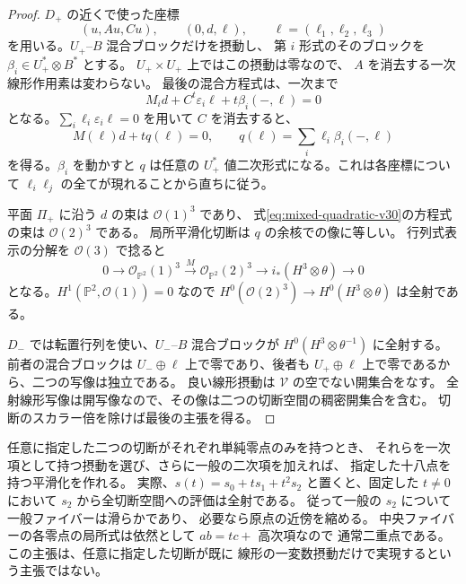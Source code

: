 \begin{proof}
$D_+$ の近くで使った座標
\[
 (u,Au,Cu),\qquad(0,d,\ell),\qquad
 \ell=(\ell_1,\ell_2,\ell_3)
\]
を用いる。$U_+$--$B$ 混合ブロックだけを摂動し、
第 $i$ 形式のそのブロックを
$\beta_i\in U_+^*\otimes B^*$ とする。
$U_+\times U_+$ 上ではこの摂動は零なので、
$A$ を消去する一次線形作用素は変わらない。
最後の混合方程式は、一次まで
\[
 M_i d+C^t\varepsilon_i\ell+t\beta_i(-,\ell)=0
\]
となる。$\sum_i\ell_i\varepsilon_i\ell=0$ を用いて $C$ を消去すると、
\begin{equation}
 M(\ell)d+tq(\ell)=0,\qquad
 q(\ell)=\sum_i\ell_i\beta_i(-,\ell)
 \label{eq:mixed-quadratic-v30}
\end{equation}
を得る。$\beta_i$ を動かすと $q$ は任意の
$U_+^*$ 値二次形式になる。これは各座標について
$\ell_i\ell_j$ の全てが現れることから直ちに従う。

平面 $\Pi_+$ に沿う $d$ の束は $\mathcal O(1)^3$ であり、
式\eqref{eq:mixed-quadratic-v30}の方程式の束は $\mathcal O(2)^3$ である。
局所平滑化切断は $q$ の余核での像に等しい。
行列式表示の分解を $\mathcal O(3)$ で捻ると
\begin{equation}
 0\longrightarrow\mathcal O_{\mathbb P^2}(1)^3
 \xrightarrow{M}\mathcal O_{\mathbb P^2}(2)^3
 \longrightarrow i_*(H^3\otimes\theta)\longrightarrow0
 \label{eq:t1-resolution-v30}
\end{equation}
となる。$H^1(\mathbb P^2,\mathcal O(1))=0$ なので
$H^0(\mathcal O(2)^3)\to H^0(H^3\otimes\theta)$ は全射である。

$D_-$ では転置行列を使い、$U_-$--$B$ 混合ブロックが
$H^0(H^3\otimes\theta^{-1})$ に全射する。
前者の混合ブロックは $U_-\oplus\ell$ 上で零であり、後者も
$U_+\oplus\ell$ 上で零であるから、二つの写像は独立である。
良い線形摂動は $\mathcal V$ の空でない開集合をなす。
全射線形写像は開写像なので、その像は二つの切断空間の稠密開集合を含む。
切断のスカラー倍を除けば最後の主張を得る。
\end{proof}

\begin{remark}[切断をあらかじめ指定した場合]
\label{rem:prescribed-zeros-v30}
任意に指定した二つの切断がそれぞれ単純零点のみを持つとき、
それらを一次項として持つ摂動を選び、さらに一般の二次項を加えれば、
指定した十八点を持つ平滑化を作れる。
実際、$s(t)=s_0+t s_1+t^2s_2$ と置くと、固定した $t\ne0$ において
$s_2$ から全切断空間への評価は全射である。
従って一般の $s_2$ について一般ファイバーは滑らかであり、
必要なら原点の近傍を縮める。
中央ファイバーの各零点の局所式は依然として $ab=tc+$ 高次項なので
通常二重点である。この主張は、任意に指定した切断が既に
線形の一変数摂動だけで実現するという主張ではない。
\end{remark}

